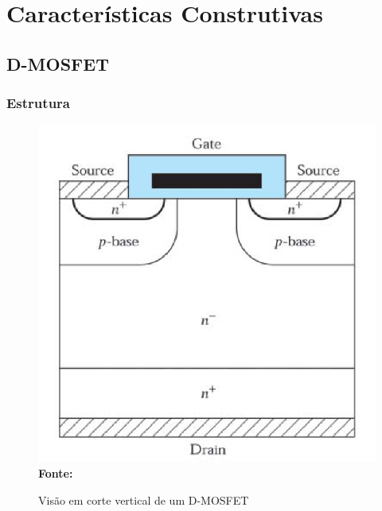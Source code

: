 \section{Características Construtivas}

\subsection{D-MOSFET}

\begin{frame}

    \frametitle{Estrutura}

    \begin{figure}[!htbp]
        \centering
        \caption{Visão em corte vertical de um D-MOSFET}
        \includegraphics[scale=0.2]{imagens/dmos.png}
        \\\small{\textbf{Fonte:} \cite{sze2012semiconductor}}%
    \end{figure}

\end{frame}

